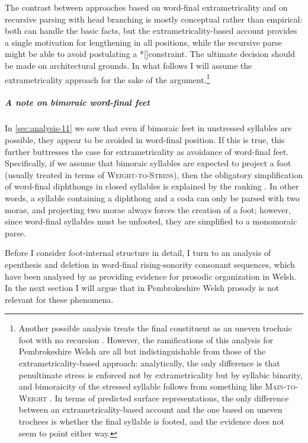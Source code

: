The contrast between approaches based on word\hyp final extrametricality and on recursive parsing with head branching is mostly conceptual rather than empirical: both can handle the basic facts, but the extrametricality\hyp based account provides a single motivation for lengthening in all positions, while the recursive parse might be able to avoid postulating a *[\mo\mo]\ssy constraint. The ultimate decision should be made on architectural grounds. In what follows I will assume the  extrametricality approach for the sake of the argument.\footnote{Another possible analysis treats the final constituent as an uneven trochaic foot with no recursion \citep{jacobs90,jacobs00,hulst96:_kamber,mellander04:_hl}. However, the ramifications of this analysis for Pembrokeshire Welsh are all but indistinguishable from those of the extrametricality\hyp based approach: analytically, the only difference is that penultimate stress is enforced not by extrametricality but by syllabic binarity, and bimoraicity of the stressed syllable follows from something like \textsc{Main-to-Weight} \citep{mcgarrity03,bye08}. In terms of predicted surface representations, the only difference between an extrametricality-based account and the one based on uneven trochees is whether the final syllable is footed, and the evidence does not seem to point either way.}

\subparagraph{A note on bimoraic word-final feet}
\label{sec:note-bimoraic-feet}

In \cref{sec:analysis-11} we saw that even if bimoraic feet in unstressed syllables are possible, they appear to be avoided in word-final position. If this is true, this further buttresses the case for extrametricality as avoidance of word-final feet. Specifically, if we assume that bimoraic syllables are expected to project a foot (usually treated in terms of \textsc{Weight-to-Stress}), then the obligatory simplification of word-final diphthongs in closed syllables is explained by the ranking . In other words, a syllable containing a diphthong and a coda can only be parsed with two morae, and projecting two morae always forces the creation of a foot; however, since word-final syllables must be unfooted, they are simplified to a monomoraic parse.

Before I consider foot-internal structure in detail, I turn to an analysis of epenthesis and deletion in word-final rising\hyp sonority consonant sequences, which have been analysed by \citet{hannahs09:_welsh} as providing evidence for prosodic organization in Welsh. In the next section I will argue that in Pembrokeshire Welsh prosody is not relevant for these phenomena.

